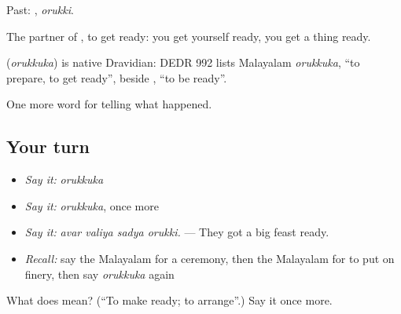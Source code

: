 Past: , \emph{orukki}.

The partner of , to get ready: you get yourself ready, you get a thing ready.

\begin{cousinweb}
\textbf{} (\emph{orukkuka}) is native Dravidian: DEDR 992 lists Malayalam \emph{orukkuka}, \textquotedblleft{}to prepare, to get ready\textquotedblright{}, beside , \textquotedblleft{}to be ready\textquotedblright{}.
\end{cousinweb}

\begin{grammarlens}[title={What you've built}]
One more word for telling what happened.
\end{grammarlens}

\subsection*{Your turn}
\begin{itemize}
\raggedright
  \item \emph{Say it:} \emph{orukkuka}
  \item \emph{Say it:} \emph{orukkuka}, once more
  \item \emph{Say it:} \emph{avar valiya sadya orukki.} — They got a big feast ready.
  \item \emph{Recall:} say the Malayalam for a ceremony, then the Malayalam for to put on finery, then say \emph{orukkuka} again
\end{itemize}

\begin{tcolorbox}[breakable,colback=teal!4,colframe=teal!35!black,title={Before you move on}]
What does  mean? (\textquotedblleft{}To make ready; to arrange\textquotedblright{}.) Say it once more.
\end{tcolorbox}
